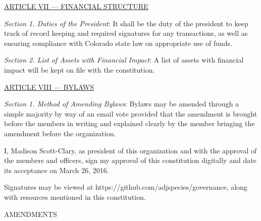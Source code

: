 \documentclass{article}
\begin{document}
\bigskip

\large{\underline{ARTICLE VII --- FINANCIAL STRUCTURE}}

\emph{Section 1. Duties of the President}: It shall be the duty of the president to keep track of record keeping and required signatures for any transactions, as well as ensuring compliance with Colorado state law on appropriate use of funds.

\emph{Section 2. List of Assets with Financial Impact}: A list of assets with financial impact will be kept on file with the constitution.

\bigskip

\large{\underline{ARTICLE VIII --- BYLAWS}}

\emph{Section 1. Method of Amending Bylaws}: Bylaws may be amended through a simple majority by way of an email vote provided that the amendment is brought before the members in writing and explained clearly by the member bringing the amendment before the organization.

\newpage

I, Madison Scott-Clary, as president of this organization and with the approval of the members and officers, sign my approval of this constitution digitally and date its acceptance on March 26, 2016.

Signatures may be viewed at https://github.com/adjspecies/governance, along with resources mentioned in this constitution.

\bigskip

\newpage

\begin{center}
\Huge{AMENDMENTS}
\end{center}
\end{document}
